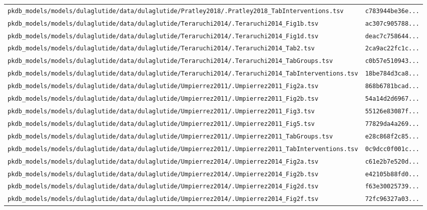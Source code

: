 \begin{longtable}{ll}
\texttt{pkdb\_models/models/dulaglutide/data/dulaglutide/Pratley2018/.Pratley2018\_TabInterventions.tsv} & \texttt{c783944be36e...} \\
\texttt{pkdb\_models/models/dulaglutide/data/dulaglutide/Teraruchi2014/.Teraruchi2014\_Fig1b.tsv} & \texttt{ac307c905788...} \\
\texttt{pkdb\_models/models/dulaglutide/data/dulaglutide/Teraruchi2014/.Teraruchi2014\_Fig1d.tsv} & \texttt{deac7c758644...} \\
\texttt{pkdb\_models/models/dulaglutide/data/dulaglutide/Teraruchi2014/.Teraruchi2014\_Tab2.tsv} & \texttt{2ca9ac22fc1c...} \\
\texttt{pkdb\_models/models/dulaglutide/data/dulaglutide/Teraruchi2014/.Teraruchi2014\_TabGroups.tsv} & \texttt{c0b57e510943...} \\
\texttt{pkdb\_models/models/dulaglutide/data/dulaglutide/Teraruchi2014/.Teraruchi2014\_TabInterventions.tsv} & \texttt{18be784d3ca8...} \\
\texttt{pkdb\_models/models/dulaglutide/data/dulaglutide/Umpierrez2011/.Umpierrez2011\_Fig2a.tsv} & \texttt{868b6781bcad...} \\
\texttt{pkdb\_models/models/dulaglutide/data/dulaglutide/Umpierrez2011/.Umpierrez2011\_Fig2b.tsv} & \texttt{54a14d2d6967...} \\
\texttt{pkdb\_models/models/dulaglutide/data/dulaglutide/Umpierrez2011/.Umpierrez2011\_Fig3.tsv} & \texttt{55126e83087f...} \\
\texttt{pkdb\_models/models/dulaglutide/data/dulaglutide/Umpierrez2011/.Umpierrez2011\_Fig5.tsv} & \texttt{77829da4a269...} \\
\texttt{pkdb\_models/models/dulaglutide/data/dulaglutide/Umpierrez2011/.Umpierrez2011\_TabGroups.tsv} & \texttt{e28c868f2c85...} \\
\texttt{pkdb\_models/models/dulaglutide/data/dulaglutide/Umpierrez2011/.Umpierrez2011\_TabInterventions.tsv} & \texttt{0c9dcc0f001c...} \\
\texttt{pkdb\_models/models/dulaglutide/data/dulaglutide/Umpierrez2014/.Umpierrez2014\_Fig2a.tsv} & \texttt{c61e2b7e520d...} \\
\texttt{pkdb\_models/models/dulaglutide/data/dulaglutide/Umpierrez2014/.Umpierrez2014\_Fig2b.tsv} & \texttt{e42105b88fd0...} \\
\texttt{pkdb\_models/models/dulaglutide/data/dulaglutide/Umpierrez2014/.Umpierrez2014\_Fig2d.tsv} & \texttt{f63e30025739...} \\
\texttt{pkdb\_models/models/dulaglutide/data/dulaglutide/Umpierrez2014/.Umpierrez2014\_Fig2f.tsv} & \texttt{72fc96327a03...} \\

\end{longtable}
